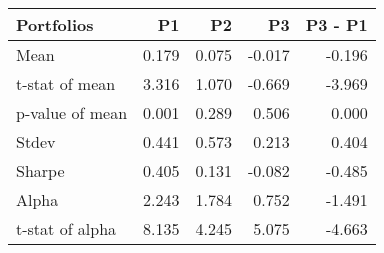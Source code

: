 \begin{tabular}{lrrrr}
\toprule
Portfolios & P1 & P2 & P3 & P3 - P1 \\
\midrule
Mean & 0.179 & 0.075 & -0.017 & -0.196 \\
t-stat of mean & 3.316 & 1.070 & -0.669 & -3.969 \\
p-value of mean & 0.001 & 0.289 & 0.506 & 0.000 \\
Stdev & 0.441 & 0.573 & 0.213 & 0.404 \\
Sharpe & 0.405 & 0.131 & -0.082 & -0.485 \\
Alpha & 2.243 & 1.784 & 0.752 & -1.491 \\
t-stat of alpha & 8.135 & 4.245 & 5.075 & -4.663 \\
\bottomrule
\end{tabular}
